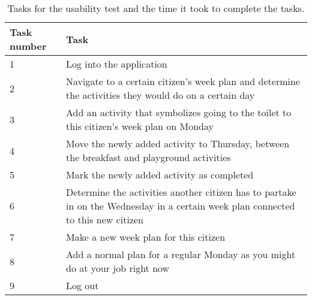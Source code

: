 \begin{table}[H]
    \small
    \begin{tabular}{|p{1.3cm}|p{12cm}|}
    \hline
    Task number      &Task                                                                                                                \\ \hline
    1 & Log into the application                                                                                                           \\ \hline
    2 & Navigate to a certain citizen's week plan and determine the activities they would do on a certain day                              \\ \hline
    3 & Add an activity that symbolizes going to the toilet to this citizen's week plan on Monday                                           \\ \hline
    4 & Move the newly added activity to Thursday, between the breakfast and playground activities                                          \\ \hline
    5 & Mark the newly added activity as completed                                                                                             \\ \hline
    6 & Determine the activities another citizen has to partake in on the Wednesday in a certain week plan connected to this new citizen      \\ \hline
    7 & Make a new week plan for this citizen                                                                                                \\ \hline
    8 & Add a normal plan for a regular Monday as you might do at your job right now                                                            \\ \hline
    9 & Log out                                                                                                                                \\ \hline
    \end{tabular}
    \caption{Tasks for the usability test and the time it took to complete the tasks.}\label{table:usability_tasks}
\end{table}

